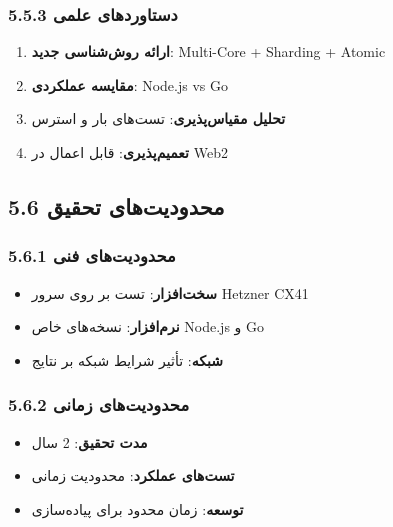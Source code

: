 \documentclass[
]{article}
\providecommand{\tightlist}{%
  \setlength{\itemsep}{0pt}\setlength{\parskip}{0pt}}
\begin{document}
\subsubsection{5.5.3 دستاوردهای
علمی}\label{ux62fux633ux62aux627ux648ux631ux62fux647ux627ux6cc-ux639ux644ux645ux6cc}

\begin{enumerate}
\def\labelenumi{\arabic{enumi}.}
\tightlist
\item
  \textbf{ارائه روش‌شناسی جدید}: Multi-Core + Sharding + Atomic
\item
  \textbf{مقایسه عملکردی}: Node.js vs Go
\item
  \textbf{تحلیل مقیاس‌پذیری}: تست‌های بار و استرس
\item
  \textbf{تعمیم‌پذیری}: قابل اعمال در Web2
\end{enumerate}

\subsection{5.6 محدودیت‌های
تحقیق}\label{ux645ux62dux62fux648ux62fux6ccux62aux647ux627ux6cc-ux62aux62dux642ux6ccux642-1}

\subsubsection{5.6.1 محدودیت‌های
فنی}\label{ux645ux62dux62fux648ux62fux6ccux62aux647ux627ux6cc-ux641ux646ux6cc-2}

\begin{itemize}
\tightlist
\item
  \textbf{سخت‌افزار}: تست بر روی سرور Hetzner CX41
\item
  \textbf{نرم‌افزار}: نسخه‌های خاص Node.js و Go
\item
  \textbf{شبکه}: تأثیر شرایط شبکه بر نتایج
\end{itemize}

\subsubsection{5.6.2 محدودیت‌های
زمانی}\label{ux645ux62dux62fux648ux62fux6ccux62aux647ux627ux6cc-ux632ux645ux627ux646ux6cc-2}

\begin{itemize}
\tightlist
\item
  \textbf{مدت تحقیق}: 2 سال
\item
  \textbf{تست‌های عملکرد}: محدودیت زمانی
\item
  \textbf{توسعه}: زمان محدود برای پیاده‌سازی
\end{itemize}
\end{document}
